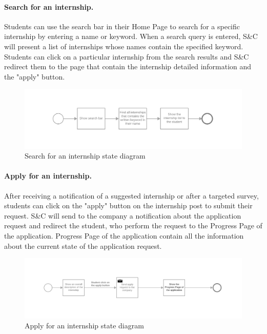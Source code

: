 \paragraph{Search for an internship.}
Students can use the search bar in their Home Page to search for a specific internship by entering a name or keyword. When a search query is entered, S\&C will present a list of internships whose names contain the specified keyword.
Students can click on a particular internship from the search results and S\&C redirect them to the page that contain the internship detailed information and the "apply" button.


\begin{figure}[H]
    \begin{center}
        \includegraphics[width=1\linewidth]{RASD/LaTeX/Images/StateDiagrams/search_for_an_internship.png}
        \caption{Search for an internship state diagram}
        \label{fig:search_for_an_internship_sd}%
    \end{center}
\end{figure}

\paragraph{Apply for an internship.}
After receiving a notification of a suggested internship or after a targeted survey, students can click on the "apply" button on the internship post to submit their request.
S\&C will send to the company a notification about the application request and redirect the student, who perform the request to the Progress Page of the application.
Progress Page of the application contain all the information about the current state of the application request.

\begin{figure}[H]
    \begin{center}
        \includegraphics[width=1\linewidth]{RASD/LaTeX/Images/StateDiagrams/apply_for_an_internship.png}
        \caption{Apply for an internship state diagram}
        \label{fig:apply_for_an_internship_sd}%
    \end{center}
\end{figure}

